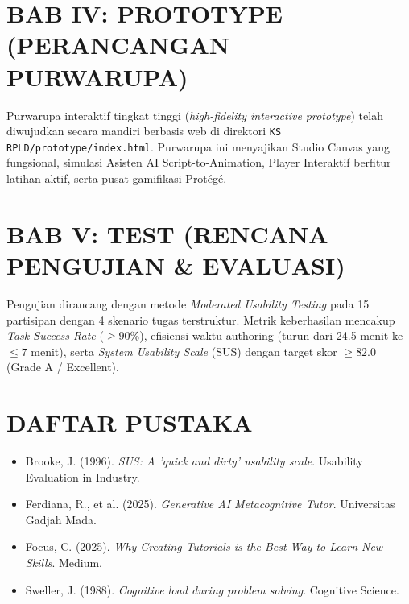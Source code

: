 \documentclass[11pt,a4paper]{article}
\begin{document}
\section{BAB IV: PROTOTYPE (PERANCANGAN PURWARUPA)}
Purwarupa interaktif tingkat tinggi (\textit{high-fidelity interactive prototype}) telah diwujudkan secara mandiri berbasis web di direktori \texttt{KS RPLD/prototype/index.html}. Purwarupa ini menyajikan Studio Canvas yang fungsional, simulasi Asisten AI Script-to-Animation, Player Interaktif berfitur latihan aktif, serta pusat gamifikasi Prot\'eg\'e.

\section{BAB V: TEST (RENCANA PENGUJIAN \& EVALUASI)}
Pengujian dirancang dengan metode \textit{Moderated Usability Testing} pada 15 partisipan dengan 4 skenario tugas terstruktur. Metrik keberhasilan mencakup \textit{Task Success Rate} ($\ge 90\%$), efisiensi waktu authoring (turun dari 24.5 menit ke $\le 7$ menit), serta \textit{System Usability Scale} (SUS) dengan target skor $\ge 82.0$ (Grade A / Excellent).

\section*{DAFTAR PUSTAKA}
\begin{itemize}
  \item Brooke, J. (1996). \textit{SUS: A 'quick and dirty' usability scale}. Usability Evaluation in Industry.
  \item Ferdiana, R., et al. (2025). \textit{Generative AI Metacognitive Tutor}. Universitas Gadjah Mada.
  \item Focus, C. (2025). \textit{Why Creating Tutorials is the Best Way to Learn New Skills}. Medium.
  \item Sweller, J. (1988). \textit{Cognitive load during problem solving}. Cognitive Science.
\end{itemize}
\end{document}
